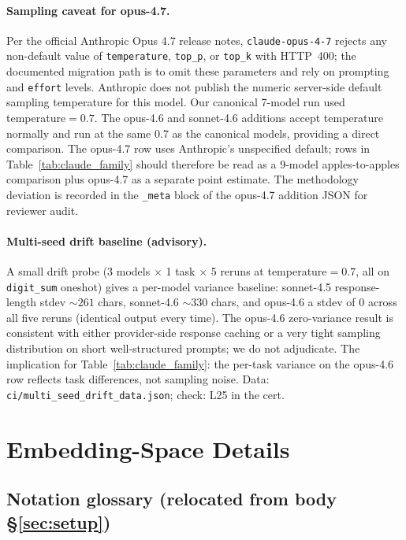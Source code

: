 \documentclass{article}
\theoremstyle{plain}
\theoremstyle{definition}
\theoremstyle{remark}
\begin{document}
\paragraph{Sampling caveat for opus-4.7.}
Per the official Anthropic Opus 4.7 release notes, \texttt{claude-opus-4-7} rejects any non-default value of \texttt{temperature}, \texttt{top\_p}, or \texttt{top\_k} with HTTP~400; the documented migration path is to omit these parameters and rely on prompting and \texttt{effort} levels. Anthropic does not publish the numeric server-side default sampling temperature for this model. Our canonical 7-model run used temperature$=0.7$. The opus-4.6 and sonnet-4.6 additions accept temperature normally and run at the same $0.7$ as the canonical models, providing a direct comparison. The opus-4.7 row uses Anthropic's unspecified default; rows in Table~\ref{tab:claude_family} should therefore be read as a 9-model apples-to-apples comparison plus opus-4.7 as a separate point estimate. The methodology deviation is recorded in the \texttt{\_meta} block of the opus-4.7 addition JSON for reviewer audit.

\paragraph{Multi-seed drift baseline (advisory).} A small drift probe (3 models $\times$ 1 task $\times$ 5 reruns at temperature$=0.7$, all on \texttt{digit\_sum} oneshot) gives a per-model variance baseline: sonnet-4.5 response-length stdev $\sim 261$ chars, sonnet-4.6 $\sim 330$ chars, and opus-4.6 a stdev of $0$ across all five reruns (identical output every time). The opus-4.6 zero-variance result is consistent with either provider-side response caching or a very tight sampling distribution on short well-structured prompts; we do not adjudicate. The implication for Table~\ref{tab:claude_family}: the per-task variance on the opus-4.6 row reflects task differences, not sampling noise. Data: \texttt{ci/multi\_seed\_drift\_data.json}; check: L25 in the cert.

\section{Embedding-Space Details}\label{app:embedding_table}

\subsection{Notation glossary (relocated from body \S\ref{sec:setup})}
\end{document}
